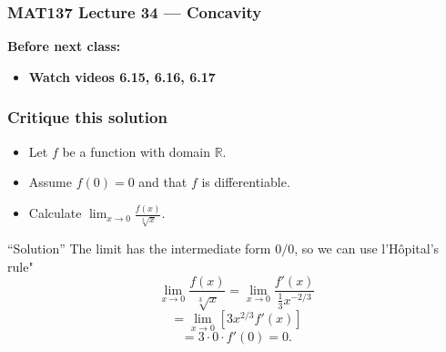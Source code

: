 \documentclass[14pt]{beamer}
\newcommand{\setsize}[1]{\fontsize{#1}{#1}\selectfont} %
\newcommand{\smallerfont}{\setsize{13}} %
\begin{document}
\begin{frame}
	\frametitle{MAT137 Lecture 34 --- Concavity}

	\vfill
	{\bf Before next class:}
		\begin{itemize} \normalsize
			\item {\bf Watch videos 6.15, 6.16, 6.17}
		\end{itemize}
\end{frame}

	\begin{frame}[t]
		\frametitle{Critique this solution}

		\smallerfont
		\begin{itemize}
			\item Let $f$ be a function with domain $\mathbb R$.
			\item Assume $f(0)=0$ and that $f$ is differentiable.
			\item Calculate $\displaystyle\lim_{x\to 0}\frac{f(x)}{\sqrt[3]{x}}$.
		\end{itemize}

		\begin{block}{``Solution''}
			The limit has the intermediate form $0/0$, so we can use l'H\^opital's rule"
			\[
				\lim_{x\to 0}\frac{f(x)}{\sqrt[3]{x}} = \lim_{x\to 0}\frac{f'(x)}{\frac{1}{3}x^{-2/3}}
			\]
			\[
				=\lim_{x\to0}\left[ 3x^{2/3}f'(x) \right]
			\]
			\[
				=3\cdot0\cdot f'(0)=0.
			\]
		\end{block}

	\end{frame}
\end{document}
